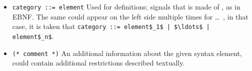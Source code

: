 \begin{itemize}
  \item \lstinline!category ::= element! \newline
    Used for definitions; signals that  is made of , as in EBNF. The same  could appear on the left side multiple times for  \ldots\ , in that case, it is taken that \lstinline!category ::= element$_1$ | $\ldots$ | element$_n$!.
  \item \lstinline!(* comment *)! \newline
    An additional information about the given syntax element, could contain additional restrictions described textually. 
\end{itemize}








